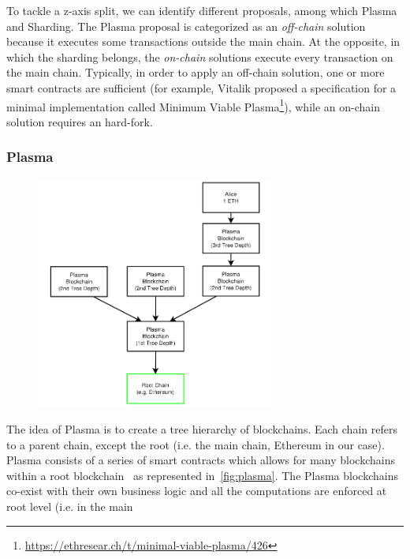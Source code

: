 To tackle a z-axis split, we can identify different proposals, among which
Plasma and Sharding. The Plasma proposal is categorized as an \emph{off-chain}
solution because it executes some transactions outside the main chain. At the
opposite, in which the sharding belongs, the \emph{on-chain} solutions execute
every transaction on the main chain. Typically, in order to apply an off-chain
solution, one or more smart contracts are sufficient (for example, Vitalik
proposed a specification for a minimal implementation called Minimum Viable
Plasma\footnote{\url{https://ethresear.ch/t/minimal-viable-plasma/426}}), while
an on-chain solution requires an hard-fork.

\subsubsection{Plasma}
\begin{figure}[t]
    \begin{center}
        \includegraphics[width=0.7\textwidth]{./res/img/plasma}
        \label{fig:plasma}
    \end{center}
\end{figure}
The idea of Plasma is to create a tree hierarchy of blockchains. Each chain
refers to a parent chain, except the root (i.e. the main chain, Ethereum in our
case). Plasma consists of a series of smart contracts which allows for many
blockchains within a root blockchain~\cite{poon2017plasma} as represented
in~\autoref{fig:plasma}. The Plasma blockchains co-exist with their own business
logic and all the computations are enforced at root level (i.e. in the main
